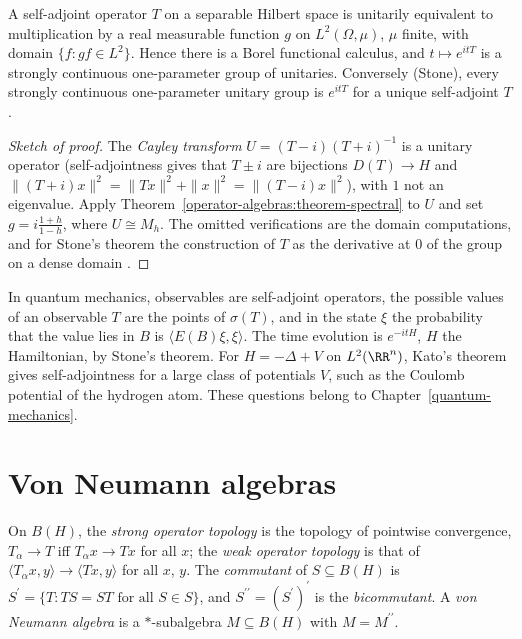 \begin{theorem}\label{operator-algebras:theorem-spectral-unbounded}
A self-adjoint operator $T$ on a separable Hilbert space is unitarily equivalent to multiplication by a real measurable function $g$ on $L^2(\Omega, \mu)$, $\mu$ finite, with domain $\{f : gf \in L^2\}$. Hence there is a
Borel functional calculus, and $t \mapsto e^{itT}$ is a strongly continuous one-parameter group of unitaries. Conversely (Stone), every strongly continuous one-parameter unitary group is $e^{itT}$ for a unique self-adjoint
$T$.
\end{theorem}

\begin{proof}[Sketch of proof]
The \emph{Cayley transform} $U = (T - i)(T + i)^{-1}$ is a unitary operator (self-adjointness gives that $T \pm i$ are bijections $D(T) \to H$ and $\|(T + i)x\|^2 = \|Tx\|^2 + \|x\|^2 = \|(T - i)x\|^2$), with $1$ not an
eigenvalue. Apply Theorem~\ref{operator-algebras:theorem-spectral} to $U$ and set $g = i\frac{1 + h}{1 - h}$, where $U \cong M_h$. The omitted verifications are the domain computations, and for Stone's theorem the construction of
$T$ as the derivative at $0$ of the group on a dense domain \cite[Chapter VIII]{reed-simon-1}.
\end{proof}

\begin{remark}\label{operator-algebras:remark-quantum}
In quantum mechanics, observables are self-adjoint operators, the possible values of an observable $T$ are the points of $\sigma(T)$, and in the state $\xi$ the probability that the value lies in $B$ is
$\langle E(B)\xi, \xi\rangle$. The time evolution is $e^{-itH}$, $H$ the Hamiltonian, by Stone's theorem. For $H = -\Delta + V$ on $L^2(\RR^n)$, Kato's theorem gives self-adjointness for a large class of potentials $V$, such as
the Coulomb potential of the hydrogen atom. These questions belong to Chapter~\ref{quantum-mechanics}.
\end{remark}

\section{Von Neumann algebras}\label{operator-algebras:section-von-neumann}

\begin{definition}\label{operator-algebras:definition-operator-topologies}
On $B(H)$, the \emph{strong operator topology} is the topology of pointwise convergence, $T_\alpha \to T$ iff $T_\alpha x \to Tx$ for all $x$; the \emph{weak operator topology} is that of $\langle T_\alpha x, y\rangle \to \langle Tx, y\rangle$
for all $x$, $y$. The \emph{commutant} of $S \subseteq B(H)$ is $S^{\prime} = \{T : TS = ST \text{ for all } S \in S\}$, and $S^{\prime\prime} = (S^{\prime})^{\prime}$ is the \emph{bicommutant}. A \emph{von Neumann algebra} is a
$*$-subalgebra $M \subseteq B(H)$ with $M = M^{\prime\prime}$.
\end{definition}

